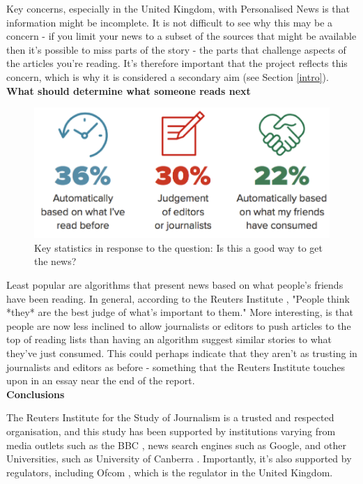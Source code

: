 \documentclass[12pt]{article}
\begin{document}
Key concerns, especially in the United Kingdom, with Personalised News is that information might be incomplete. It is not difficult to see why this may be a concern - if you limit your news to a subset of the sources that might be available then it's possible to miss parts of the story - the parts that challenge aspects of the articles you're reading. It's therefore important that the project reflects this concern, which is why it is considered a secondary aim (see Section \ref{intro}). \\

\textbf{What should determine what someone reads next}

\begin{figure}[h]
  \centering
    \includegraphics[scale=0.6]{HowPeopleTrustNews.png}
   \caption[What is a good way to get to the news?]{Key statistics in response to the question: Is this a good way to get the news?}
   \label{HowPeopleTrustNews}
\end{figure}

Least popular are algorithms that present news based on what people's friends have been reading. In general, according to the Reuters Institute \cite{reutersInstitute}, "People think *they* are the best judge of what's important to them." More interesting, is that people are now less inclined to allow journalists or editors to push articles to the top of reading lists than having an algorithm suggest similar stories to what they've just consumed. This could perhaps indicate that they aren't as trusting in journalists and editors as before - something that the Reuters Institute touches upon in an essay near the end of the report. \\

\textbf{Conclusions}

The Reuters Institute for the Study of Journalism is a trusted and respected organisation, and this study has been supported by institutions varying from media outlets such as the BBC \cite{bbc}, news search engines such as Google, and other Universities, such as University of Canberra \cite{canberra}. Importantly, it's also supported by regulators, including Ofcom \cite{ofcom}, which is the regulator in the United Kingdom. 
\end{document}
